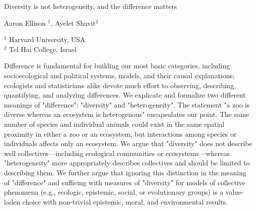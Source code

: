 \documentclass[a4paper]{article}
\begin{document}

\Large
 \begin{center}
Diversity is not heterogeneity, and the difference matters \\ 

\hspace{10pt}

\large
Aaron Ellison $^1$, Ayelet Shavit$^2$ \\

\hspace{10pt}

\small  
$^1$ Harvard University, USA\\
$^2$ Tel Hai College, Israel

\end{center}

\hspace{10pt}

\normalsize

Difference is fundamental for building our most basic categories, including socioecological and political systems, models, and their causal explanations; ecologists and statisticians alike devote much effort to observing, describing, quantifying, and analyzing differences. We explicate and formalize two different meanings of "difference": "diversity" and "heterogeneity". The statement "a zoo is diverse whereas an ecosystem is heterogenous" encapsulates our point. The same number of species and individual animals could exist in the same spatial proximity in either a zoo or an ecosystem, but interactions among species or individuals affects only an ecosystem. We argue that "diversity" does not describe well collectives—including ecological communities or ecosystems—whereas "heterogeneity" more appropriately describes collectives and should be limited to describing them. We further argue that ignoring this distinction in the meaning of "difference" and sufficing with measures of "diversity" for models of collective phenomena (e.g., ecologic, epistemic, social, or evolutionary groups) is a value-laden choice with non-trivial epistemic, moral, and environmental results.
\end{document}
